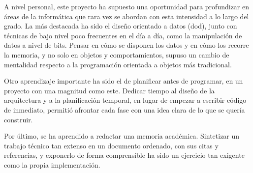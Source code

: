 A nivel personal, este proyecto ha supuesto una oportunidad para profundizar en áreas de la informática que rara vez se abordan con esta intensidad a lo largo del grado.
La más destacada ha sido el diseño orientado a datos (\acrshort{dod}), junto con técnicas de bajo nivel poco frecuentes en el día a día, como la manipulación de datos a nivel de bits.
Pensar en cómo se disponen los datos y en cómo los recorre la memoria, y no solo en objetos y comportamientos, supuso un cambio de mentalidad respecto a la programación orientada a objetos más tradicional.

Otro aprendizaje importante ha sido el de planificar antes de programar, en un proyecto con una magnitud como este.
Dedicar tiempo al diseño de la arquitectura y a la planificación temporal, en lugar de empezar a escribir código de inmediato, permitió afrontar cada fase con una idea clara de lo que se quería construir.

Por último, se ha aprendido a redactar una memoria académica.
Sintetizar un trabajo técnico tan extenso en un documento ordenado, con sus citas y referencias, y exponerlo de forma comprensible ha sido un ejercicio tan exigente como la propia implementación.
